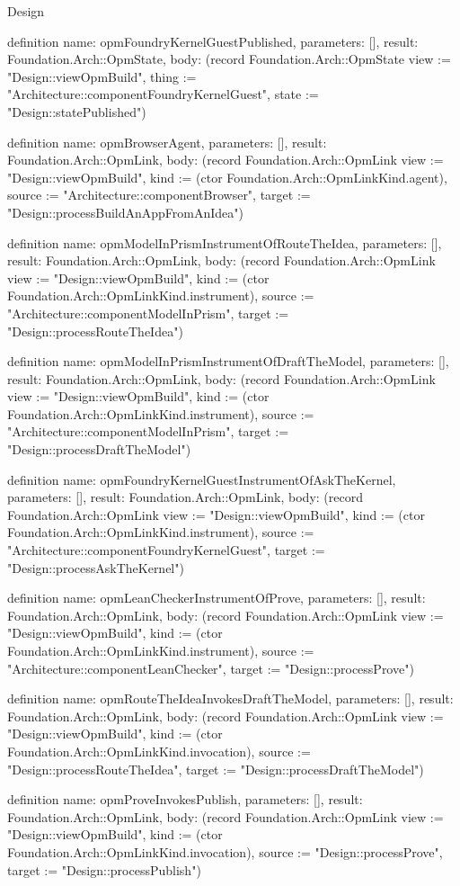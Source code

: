 \begin{lexlean}{Design}
\begin{semanticmodule}
definition{
  name: opmFoundryKernelGuestPublished,
  parameters: [],
  result: Foundation.Arch::OpmState,
  body: (record Foundation.Arch::OpmState {view := "Design::viewOpmBuild", thing := "Architecture::componentFoundryKernelGuest", state := "Design::statePublished"})
}

definition{
  name: opmBrowserAgent,
  parameters: [],
  result: Foundation.Arch::OpmLink,
  body: (record Foundation.Arch::OpmLink {view := "Design::viewOpmBuild", kind := (ctor Foundation.Arch::OpmLinkKind.agent), source := "Architecture::componentBrowser", target := "Design::processBuildAnAppFromAnIdea"})
}

definition{
  name: opmModelInPrismInstrumentOfRouteTheIdea,
  parameters: [],
  result: Foundation.Arch::OpmLink,
  body: (record Foundation.Arch::OpmLink {view := "Design::viewOpmBuild", kind := (ctor Foundation.Arch::OpmLinkKind.instrument), source := "Architecture::componentModelInPrism", target := "Design::processRouteTheIdea"})
}

definition{
  name: opmModelInPrismInstrumentOfDraftTheModel,
  parameters: [],
  result: Foundation.Arch::OpmLink,
  body: (record Foundation.Arch::OpmLink {view := "Design::viewOpmBuild", kind := (ctor Foundation.Arch::OpmLinkKind.instrument), source := "Architecture::componentModelInPrism", target := "Design::processDraftTheModel"})
}

definition{
  name: opmFoundryKernelGuestInstrumentOfAskTheKernel,
  parameters: [],
  result: Foundation.Arch::OpmLink,
  body: (record Foundation.Arch::OpmLink {view := "Design::viewOpmBuild", kind := (ctor Foundation.Arch::OpmLinkKind.instrument), source := "Architecture::componentFoundryKernelGuest", target := "Design::processAskTheKernel"})
}

definition{
  name: opmLeanCheckerInstrumentOfProve,
  parameters: [],
  result: Foundation.Arch::OpmLink,
  body: (record Foundation.Arch::OpmLink {view := "Design::viewOpmBuild", kind := (ctor Foundation.Arch::OpmLinkKind.instrument), source := "Architecture::componentLeanChecker", target := "Design::processProve"})
}

definition{
  name: opmRouteTheIdeaInvokesDraftTheModel,
  parameters: [],
  result: Foundation.Arch::OpmLink,
  body: (record Foundation.Arch::OpmLink {view := "Design::viewOpmBuild", kind := (ctor Foundation.Arch::OpmLinkKind.invocation), source := "Design::processRouteTheIdea", target := "Design::processDraftTheModel"})
}

definition{
  name: opmProveInvokesPublish,
  parameters: [],
  result: Foundation.Arch::OpmLink,
  body: (record Foundation.Arch::OpmLink {view := "Design::viewOpmBuild", kind := (ctor Foundation.Arch::OpmLinkKind.invocation), source := "Design::processProve", target := "Design::processPublish"})
}


\end{semanticmodule}
\end{lexlean}
